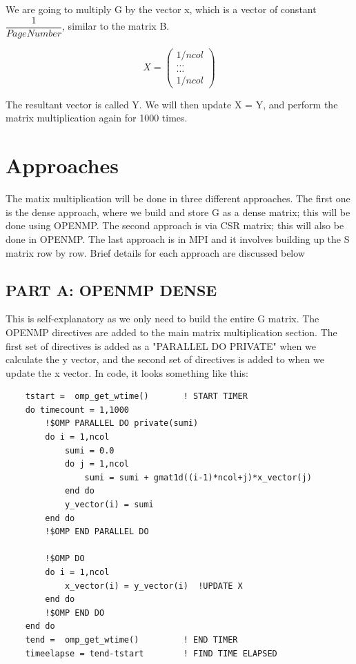 \documentclass[12pt]{article}
\begin{document}
    \noindent
    We are going to multiply G by the vector x, which is a vector of constant $\dfrac{1}{PageNumber}$, similar to the matrix B. 


    \[
        X = \begin{pmatrix}
          1/ncol\\
          \dots \\
          \dots \\
          1/ncol
        \end{pmatrix}
    \]

    \noindent
    The resultant vector is called Y. We will then update X = Y, and perform the matrix multiplication again for 1000 times.
    
    \newpage
    \section{Approaches}
    The matix multiplication will be done in three different approaches. The first one is the dense approach, where we build and store G as a dense matrix; this will be done using OPENMP. The second approach is via CSR matrix; this will also be done in OPENMP. The last approach is in MPI and it involves building up the S matrix row by row. Brief details for each approach are discussed below

    \subsection{PART A: OPENMP DENSE}
    This is self-explanatory as we only need to build the entire G matrix. The OPENMP directives are added to the main matrix multiplication section. The first set of directives is added as a "PARALLEL DO PRIVATE" when we calculate the y vector, and the second set of directives is added to when we update the x vector. In code, it looks something like this:

    \begin{lstlisting}
    tstart =  omp_get_wtime()       ! START TIMER
    do timecount = 1,1000
        !$OMP PARALLEL DO private(sumi)
        do i = 1,ncol
            sumi = 0.0
            do j = 1,ncol
                sumi = sumi + gmat1d((i-1)*ncol+j)*x_vector(j)
            end do
            y_vector(i) = sumi
        end do  
        !$OMP END PARALLEL DO
            
        !$OMP DO
        do i = 1,ncol
            x_vector(i) = y_vector(i)  !UPDATE X
        end do
        !$OMP END DO
    end do        
    tend =  omp_get_wtime()         ! END TIMER    
    timeelapse = tend-tstart        ! FIND TIME ELAPSED
    
    \end{lstlisting}
\end{document}
